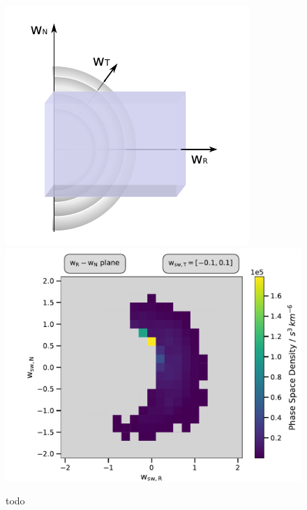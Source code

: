 \begin{figure}[h]
	\includegraphics[width=.4\textwidth]{Figures/slice_T2.pdf}
	\includegraphics[scale=.45]{Figures/slice_psd_T.pdf}
	\centering
	\caption{todo}
	\label{fig:sketch_slice_T}
\end{figure}


